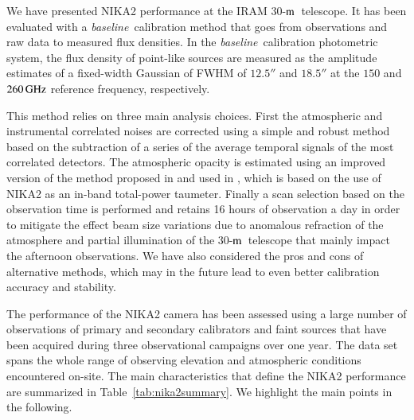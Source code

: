 \documentclass[traditionalabstract]{aa}
\newcommand{\trentemetre}{30-$\rm{m}$}
\newcommand{\baseline}{\emph{baseline}}
\newcommand{\lp}[1]{#1}
\begin{document}
{\lp We have presented NIKA2 performance at the IRAM
  \trentemetre\ telescope. It has been evaluated with a
  \baseline\ calibration method that goes from
  observations and raw data to measured flux densities.
  In the \baseline\ calibration photometric system, the flux
  density of point-like sources are measured as the amplitude estimates
  of a fixed-width Gaussian of FWHM of $12.5''$ and $18.5''$ at the
$150$ and $260\,\rm{GHz}$ reference frequency, respectively.

  This method relies on three main analysis choices. First the
  atmospheric and instrumental correlated noises are corrected using a
  simple and robust method based on the subtraction of a series of
  the average temporal signals of the most correlated detectors. The
  atmospheric opacity is estimated using an improved version of 
  the method proposed in \citet{Catalano2014} and used in
  \citet{Adam2018}, which is based on the use of
  NIKA2 as an in-band total-power taumeter. Finally a scan selection
  based on the observation time is performed and retains 16 hours
  of observation a day in order to mitigate the effect beam size
  variations due to anomalous refraction of the atmosphere and
  partial illumination of the \trentemetre\ telescope that mainly
  impact the afternoon observations. We have also considered the pros
  and cons of alternative methods, which may in the future lead to even
  better calibration accuracy and stability.}

The performance of the NIKA2 camera has been assessed using a large
number of observations of primary and secondary calibrators and faint
 sources that have been acquired during three
observational campaigns over one year. The data set spans the whole
range of observing
elevation and atmospheric conditions encountered on-site.
The main characteristics that define the NIKA2 performance are
summarized in Table~\ref{tab:nika2summary}. We highlight the main
points in the following.
\end{document}
